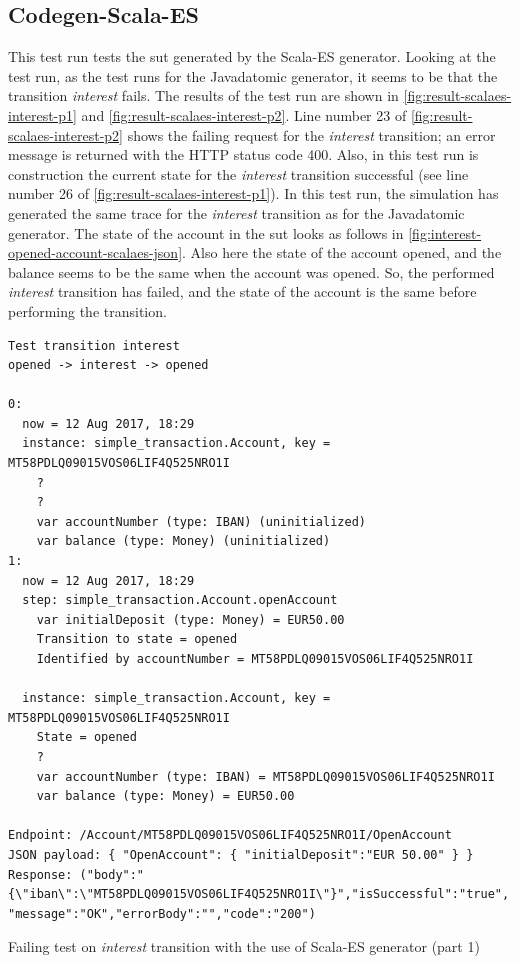 \subsection{Codegen-Scala-ES}\label{sec:bug-interest-scalaes}

This test run tests the \gls{sut} generated by the Scala-ES generator. Looking at the
test run, as the test runs for the Javadatomic generator, it seems to be
that the transition \textit{interest} fails. The results of the test run are shown in
\autoref{fig:result-scalaes-interest-p1} and \autoref{fig:result-scalaes-interest-p2}.
Line number 23 of \autoref{fig:result-scalaes-interest-p2} shows the failing
request for the \textit{interest} transition;
an error message is returned with the HTTP status code 400.
Also, in this test run is construction the current state for the
\textit{interest} transition successful (see line number 26 of \autoref{fig:result-scalaes-interest-p1}).
In this test run, the simulation has generated the same trace for the
\textit{interest} transition as for the Javadatomic generator. The state of the
account in the \gls{sut} looks as follows in
\autoref{fig:interest-opened-account-scalaes-json}. Also here the state of the
account opened, and the balance seems to be the same when the account was opened.
So, the performed \textit{interest} transition has failed, and the state of the account
is the same before performing the transition.

\begin{sourcecode}[h!]
\begin{lstlisting}[]
Test transition interest
opened -> interest -> opened

0:
  now = 12 Aug 2017, 18:29
  instance: simple_transaction.Account, key = MT58PDLQ09015VOS06LIF4Q525NRO1I
    ?
    ?
    var accountNumber (type: IBAN) (uninitialized)
    var balance (type: Money) (uninitialized)
1:
  now = 12 Aug 2017, 18:29
  step: simple_transaction.Account.openAccount
    var initialDeposit (type: Money) = EUR50.00
    Transition to state = opened
    Identified by accountNumber = MT58PDLQ09015VOS06LIF4Q525NRO1I

  instance: simple_transaction.Account, key = MT58PDLQ09015VOS06LIF4Q525NRO1I
    State = opened
    ?
    var accountNumber (type: IBAN) = MT58PDLQ09015VOS06LIF4Q525NRO1I
    var balance (type: Money) = EUR50.00

Endpoint: /Account/MT58PDLQ09015VOS06LIF4Q525NRO1I/OpenAccount
JSON payload: { "OpenAccount": { "initialDeposit":"EUR 50.00" } }
Response: ("body":"{\"iban\":\"MT58PDLQ09015VOS06LIF4Q525NRO1I\"}","isSuccessful":"true",
"message":"OK","errorBody":"","code":"200")
\end{lstlisting}
\caption{Failing test on \textit{interest} transition with the use of Scala-ES generator (part 1)}\label{fig:result-scalaes-interest-p1}
\end{sourcecode}
\FloatBarrier

